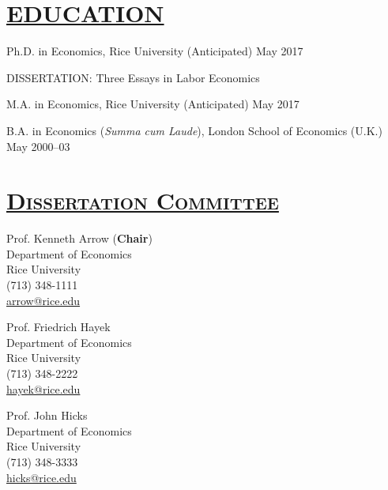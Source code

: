 \documentclass{res} %
\begin{document}
 

\thispagestyle{empty}
 


\address{  
\href{mailto:  dricardo@rice.edu}{ dricardo@rice.edu} \\ 
Department of Economics MS-22 \\
Rice University, Houston, TX 77251-1892\\
(713) 348-8411           
}
                        
\begin{resume}                         

\section{\scshape \underline{EDUCATION} }  
\vspace{6pt} 
\noindent Ph.D. in Economics, Rice University  \hfill (Anticipated) May 2017 \par
{\scshape DISSERTATION:} Three Essays in Labor Economics

\noindent M.A. in Economics, Rice University  \hfill (Anticipated) May 2017 \par
  
\noindent B.A. in Economics (\emph{Summa cum Laude}), London School of Economics (U.K.)  \hfill    May 2000--03 \par

\vspace{-.2cm}
\section{\scshape \underline{Dissertation Committee}}
\vspace{6pt} 
\begin{minipage}[t]{0.5\textwidth}
\noindent Prof. Kenneth Arrow ({\bf Chair}) \\
Department of Economics \\
Rice University \\
(713) 348-1111\\
\href{mailto:  arrow@rice.edu}{ arrow@rice.edu}

\vspace{.2cm}

Prof. Friedrich Hayek \\
Department of Economics \\
Rice University \\
(713) 348-2222\\
\href{mailto:  hayek@rice.edu}{hayek@rice.edu}\\
\end{minipage}%
\begin{minipage}[t]{0.5\textwidth}
Prof. John Hicks \\
Department of Economics\\
Rice University \\
(713) 348-3333 \\
\href{mailto:  hicks@rice.edu}{hicks@rice.edu}\\
\end{minipage}



\end{resume}
\end{document}
